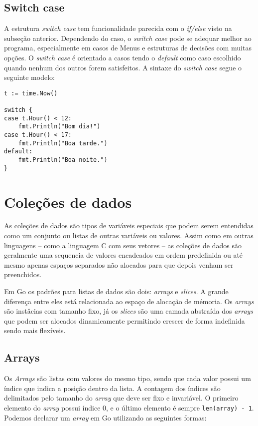 \documentclass{SBCbookchapter}
\begin{document}
\subsection{Switch case}

A estrutura \textit{switch case} tem funcionalidade parecida com o \textit{if/else} visto na subseção anterior. Dependendo do caso, o \textit{switch case} pode se adequar melhor ao programa, especialmente em casos de Menus e estruturas de decisões com muitas opções. O \textit{switch case} é orientado a casos tendo o \textit{default} como caso escolhido quando nenhum dos outros forem satisfeitos. A sintaxe do \textit{switch case} segue o seguinte modelo:
	
\begin{lstlisting}
t := time.Now()

switch {
case t.Hour() < 12:
   	fmt.Println("Bom dia!")
case t.Hour() < 17:
   	fmt.Println("Boa tarde.")
default:
   	fmt.Println("Boa noite.")
}
\end{lstlisting}

\section{Coleções de dados}

As coleções de dados são tipos de variáveis especiais que podem serem entendidas como um conjunto ou listas de outras variáveis ou valores. Assim como em outras linguagens -- como a linguagem C com seus vetores -- as coleções de dados são geralmente uma sequencia de valores encadeados em ordem predefinida ou até mesmo apenas espaços separados não alocados para que depois venham ser preenchidos.


Em Go os padrões para listas de dados são dois: \textit{arrays} e \textit{slices}. A grande diferença entre eles está relacionada ao espaço de alocação de mémoria. Os \textit{arrays} são instâcias com tamanho fixo, já os \textit{slices} são uma camada abstraída dos \textit{arrays} que podem ser alocados dinamicamente permitindo crescer de forma indefinida sendo mais flexíveis.

\subsection{Arrays}

Os \textit{Arrays} são listas com valores do mesmo tipo, sendo que cada valor possui um índice que indica a posição dentro da lista. A contagem dos índices são delimitados pelo tamanho do \textit{array} que deve ser fixo e invariável. O primeiro elemento do \textit{array} possui índice 0, e o último elemento é sempre \texttt{len(array) - 1}. Podemos declarar um \textit{array} em Go utilizando as seguintes formas:
\end{document}
